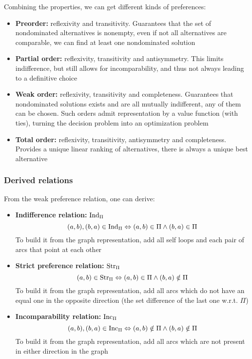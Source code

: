 Combining the properties, we can get different kinds of preferences: 
\begin{itemize}
	\item \textbf{Preorder:} reflexivity and transitivity. Guarantees that the set of nondominated alternatives is nonempty, even if not all alternatives are comparable, we can find at least one nondominated solution
	
	\item \textbf{Partial order:} reflexivity, transitivity and antisymmetry. This limits indifference, but still allows for incomparability, and thus not always leading to a definitive choice
	
	\item \textbf{Weak order:} reflexivity, transitivity and completeness. Guarantees that nondominated solutions exists and are all mutually indifferent, any of them can be chosen. Such orders admit representation by a value function (with ties), turning the decision problem into an optimization problem
	
	\item \textbf{Total order:} reflexivity, transitivity, antisymmetry and completeness. Provides a unique linear ranking of alternatives, there is always a unique best alternative
\end{itemize}

\subsubsection{Derived relations}

From the weak preference relation, one can derive: 
\begin{itemize}
	\item \textbf{Indifference relation:} $\text{Ind}_{\Pi}$
	$$ (a,b),(b,a) \in \text{Ind}_{\Pi} \Leftrightarrow (a,b) \in \Pi \wedge (b,a) \in \Pi $$
	To build it from the graph representation, add all self loops and each pair of arcs that point at each other
	
	\item \textbf{Strict preference relation:} $\text{Str}_{\Pi}$
	$$ (a,b) \in \text{Str}_{\Pi} \Leftrightarrow (a,b) \in \Pi \wedge (b,a) \notin \Pi $$
	To build it from the graph representation, add all arcs which do not have an equal one in the opposite direction (the set difference of the last one w.r.t. $\Pi$)
	
	\item \textbf{Incomparability relation:} $\text{Inc}_{\Pi}$
	$$ (a,b), (b,a) \in \text{Inc}_{\Pi} \Leftrightarrow (a,b) \notin \Pi \wedge (b,a) \notin \Pi $$
	To build it from the graph representation, add all arcs which are not present in either direction in the graph
\end{itemize}